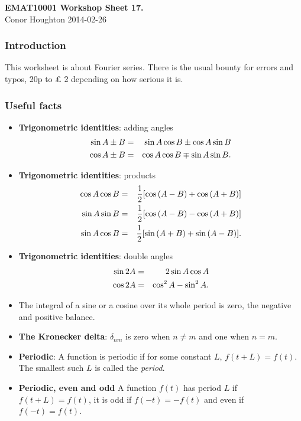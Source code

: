 \documentclass[12pt]{article}
\begin{document}
\begin{center}
{\bf EMAT10001 Workshop Sheet 17.}\\[1cm]{} Conor Houghton 2014-02-26
\end{center}
\subsubsection*{Introduction} 
This worksheet is about Fourier series. There is the usual bounty for errors and typos, 20p to \pounds
2 depending on how serious it is.

\subsubsection*{Useful facts}
\begin{itemize}

\item {\bf Trigonometric identities}: adding angles
\begin{eqnarray}
\sin{A\pm B}&=&\sin{A}\cos{B}\pm\cos{A}\sin{B}\cr
\cos{A\pm B}&=&\cos{A}\cos{B}\mp\sin{A}\sin{B}.
\end{eqnarray}
\item {\bf Trigonometric identities}: products
\begin{eqnarray}
\cos{A}\cos{B}&=&\frac{1}{2}[\cos{(A-B)}+\cos{(A+B)}]\cr
\sin{A}\sin{B}&=&\frac{1}{2}[\cos{(A-B)}-\cos{(A+B)}]\cr
\sin{A}\cos{B}&=&\frac{1}{2}[\sin{(A+B)}+\sin{(A-B)}].
\end{eqnarray}
\item {\bf Trigonometric identities}: double angles
\begin{eqnarray}
\sin{2A}&=&2\sin{A}\cos{A}\cr
\cos{2A}&=&\cos^2{A}-\sin^2{A}.
\end{eqnarray}

\item The integral of a sine or a cosine over its whole period is
  zero, the negative and positive balance.

\item {\bf The Kronecker delta}: $\delta_{nm}$ is zero when $n\not=m$ and one when $n=m$.

\item {\bf Periodic}: A function is periodic if for some constant $L$, $f(t+L)=f(t)$. The smallest such $L$ is called the {\sl period}.

\item {\bf Periodic, even and odd} A function $f(t)$ has period $L$ if $f(t+L)=f(t)$, it is odd if
$f(-t)=-f(t)$ and even if $f(-t)=f(t)$.


\end{itemize}
\end{document}

